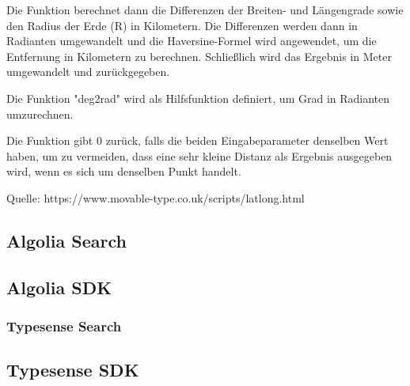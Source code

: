 Die Funktion berechnet dann die Differenzen der Breiten- und Längengrade sowie den Radius der Erde (R) in Kilometern. Die Differenzen werden dann in Radianten umgewandelt und die Haversine-Formel wird angewendet, um die Entfernung in Kilometern zu berechnen. Schließlich wird das Ergebnis in Meter umgewandelt und zurückgegeben.

Die Funktion "deg2rad" wird als Hilfsfunktion definiert, um Grad in Radianten umzurechnen.

Die Funktion gibt 0 zurück, falls die beiden
Eingabeparameter denselben Wert haben, um zu vermeiden, dass
eine sehr kleine Distanz als Ergebnis ausgegeben wird, wenn
es sich um denselben Punkt handelt.

Quelle: https://www.movable-type.co.uk/scripts/latlong.html


\author{Martin Hausleitner}


\subsection{Algolia Search}
\subsection{Algolia SDK}

\subsubsection{Typesense Search}
\subsection{Typesense SDK}
